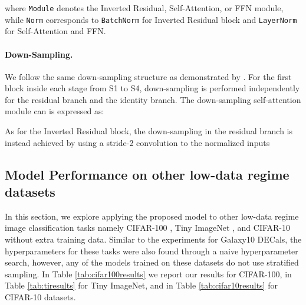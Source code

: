 \documentclass{article} \usepackage{iclr2023_conference,times}
\begin{document}
where \texttt{Module} denotes the Inverted Residual, Self-Attention, or FFN module, while \texttt{Norm} corresponds to \texttt{BatchNorm} for Inverted Residual block and \texttt{LayerNorm} for Self-Attention and FFN.

\paragraph{Down-Sampling.} We follow the same down-sampling structure as demonstrated by \cite{dai2021coatnet}. For the first block inside each stage from S1 to S4, down-sampling is performed independently for the residual branch and the identity branch. The down-sampling self-attention module can is expressed as:



As for the Inverted Residual block, the down-sampling in the residual branch is instead achieved by using a stride-2 convolution to the normalized inputs



\subsection{Model Performance on other low-data regime datasets}
\label{other datasets}

In this section, we explore applying the proposed model to other low-data regime image classification tasks namely CIFAR-100 \citep{krizhevsky2009learning}, Tiny ImageNet \citep{le2015tiny}, and CIFAR-10 \citep{krizhevsky2009learning} without extra training data. Similar to the experiments for Galaxy10 DECals, the hyperparameters for these tasks were also found through a naive hyperparameter search, however, any of the models trained on these datasets do not use stratified sampling. In Table \ref{tab:cifar100results} we report our results for CIFAR-100, in Table \ref{tab:tiresults} for Tiny ImageNet, and in Table \ref{tab:cifar10results} for CIFAR-10 datasets.
\end{document}
